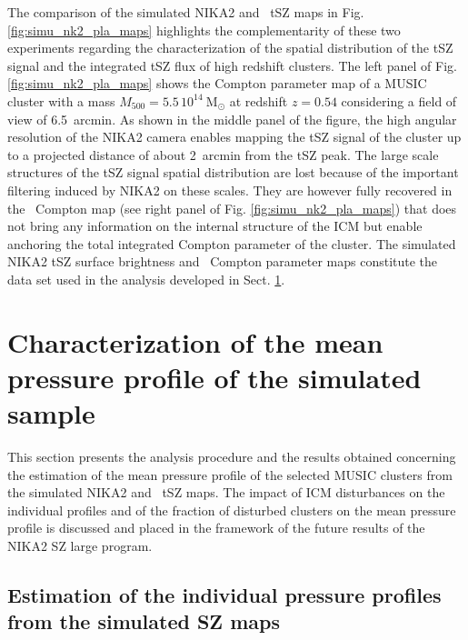 \documentclass[twocolumn,traditabstract]{aa}
\begin{document}
The comparison of the simulated NIKA2 and \planck\ tSZ maps in Fig. \ref{fig:simu_nk2_pla_maps} highlights the complementarity of these two experiments regarding the characterization of the spatial distribution of the tSZ signal and the integrated tSZ flux of high redshift clusters. The left panel of Fig. \ref{fig:simu_nk2_pla_maps} shows the Compton parameter map of a MUSIC cluster with a mass $M_{500} = 5.5 \, 10^{14}~\mathrm{M_{\odot}}$ at redshift $z = 0.54$ considering a field of view of 6.5~arcmin. As shown in the middle panel of the figure, the high angular resolution of the NIKA2 camera enables mapping the tSZ signal of the cluster up to a projected distance of about 2~arcmin from the tSZ peak. The large scale structures of the tSZ signal spatial distribution are lost because of the important filtering induced by NIKA2 on these scales. They are however fully recovered in the \planck\ Compton map (see right panel of Fig. \ref{fig:simu_nk2_pla_maps}) that does not bring any information on the internal structure of the ICM but enable anchoring the total integrated Compton parameter of the cluster. The simulated NIKA2 tSZ surface brightness and \planck\ Compton parameter maps constitute the data set used in the analysis developed in Sect. \ref{sec:mean_prof}.

\section{Characterization of the mean pressure profile of the simulated sample}\label{sec:mean_prof}

This section presents the analysis procedure and the results obtained concerning the estimation of the mean pressure profile of the selected MUSIC clusters from the simulated NIKA2 and \planck\ tSZ maps. The impact of ICM disturbances on the individual profiles and of the fraction of disturbed clusters on the mean pressure profile is discussed and placed in the framework of the future results of the NIKA2 SZ large program.

\subsection{Estimation of the individual pressure profiles from the simulated SZ maps}\label{subsec:profile_extract}
\end{document}
